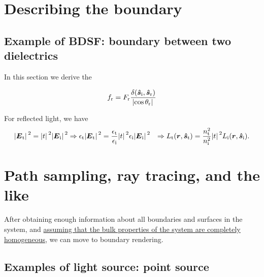 \documentclass[hyperref, a4paper]{article}
\def\\{}%
\begin{document}
\section{Describing the boundary}

\subsection{Example of BDSF: boundary between two dielectrics}

In this section we derive the 

\begin{equation}
    f_{\text{r}} = F_{\text{r}} \frac{\delta(\vu*{s}_\text{i}, \vu*{s}_{\text{r}})}{\abs*{\cos \theta_{\text{r}}}}
\end{equation}

For reflected light, we have 
\begin{equation}
    \begin{aligned}
        \abs*{\vb*{E}_{\text{t}}}^2 = \abs*{t}^2 \abs*{\vb*{E}_{\text{i}}}^2 
        &\Rightarrow \epsilon_{\text{t}} \abs*{\vb*{E}_{\text{t}}}^2 
        = \frac{\epsilon_{\text{t}}}{\epsilon_{\text{i}}} \abs*{t}^2 \epsilon_{\text{i}} \abs*{\vb*{E}_{\text{i}}}^2 \\
        &\Rightarrow L_{\text{t}}(\vb*{r}, \vu*{s}_{\text{t}}) 
        = \frac{n_{\text{t}}^2}{n_{\text{i}}^2} \abs*{t}^2 L_{\text{i}}(\vb*{r}, \vu*{s}_{\text{i}}).
    \end{aligned}
\end{equation}

\section{Path sampling, ray tracing, and the like}

After obtaining enough information about all boundaries and surfaces in the system,
and \ul{assuming that the bulk properties of the system are completely homogeneous},
we can move to boundary rendering. 

\subsection{Examples of light source: point source}
\end{document}
